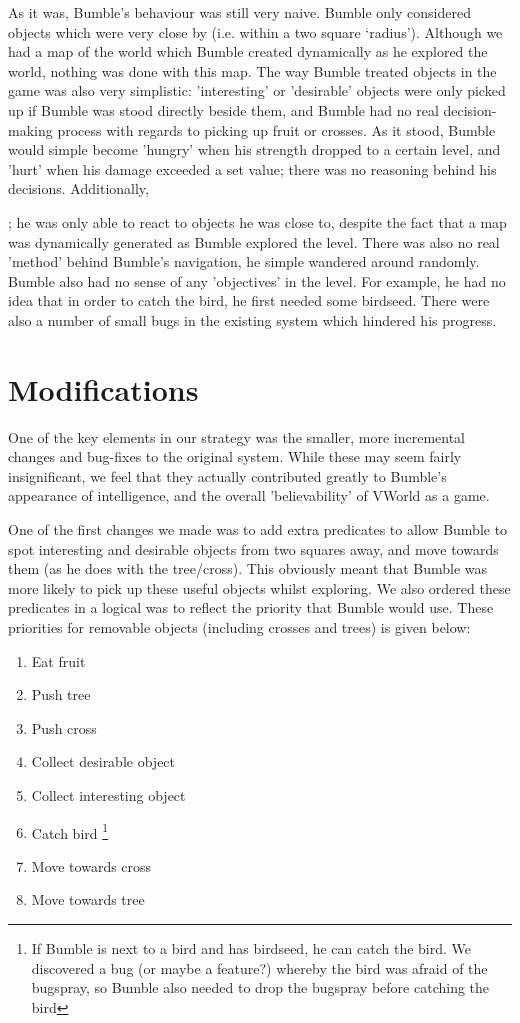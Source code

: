 \documentclass[a4paper,oneside]{report}
\begin{document}
As it was, Bumble's behaviour was still very naive. Bumble only considered objects which were very close by (i.e. within a two square `radius'). Although we had a map of the world which Bumble created dynamically as he explored the world, nothing was done with this map. The way Bumble treated objects in the game was also very simplistic: 'interesting' or 'desirable' objects were only picked up if Bumble was stood directly beside them, and Bumble had no real decision-making process with regards to picking up fruit or crosses. As it stood, Bumble would simple become 'hungry' when his strength dropped to a certain level, and 'hurt' when his damage exceeded a set value; there was no reasoning behind his decisions. Additionally, 

; he was only able to react to objects he was close to, despite the fact that a map was dynamically generated as Bumble explored the level. There was also no real 'method' behind Bumble's navigation, he simple wandered around randomly. Bumble also had no sense of any 'objectives' in the level. For example, he had no idea that in order to catch the bird, he first needed some birdseed. There were also a number of small bugs in the existing system which hindered his progress. 

\section{Modifications}

One of the key elements in our strategy was the smaller, more incremental changes and bug-fixes to the original system. While these may seem fairly insignificant, we feel that they actually contributed greatly to Bumble's appearance of intelligence, and the overall 'believability' of VWorld as a game.

One of the first changes we made was to add extra predicates to allow Bumble to spot interesting and desirable objects from two squares away, and move towards them (as he does with the tree/cross). This obviously meant that Bumble was more likely to pick up these useful objects whilst exploring. We also ordered these predicates in a logical was to reflect the priority that Bumble would use. These priorities for removable objects (including crosses and trees) is given below:

\begin{enumerate}
	\item Eat fruit
	\item Push tree
	\item Push cross
	\item Collect desirable object
	\item Collect interesting object
	\item Catch bird \footnote{If Bumble is next to a bird and has birdseed, he can catch the bird. We discovered a bug (or maybe a feature?) whereby the bird was afraid of the bugspray, so Bumble also needed to drop the bugspray before catching the bird}
	\item Move towards cross
	\item Move towards tree
\end{enumerate}
\end{document}
